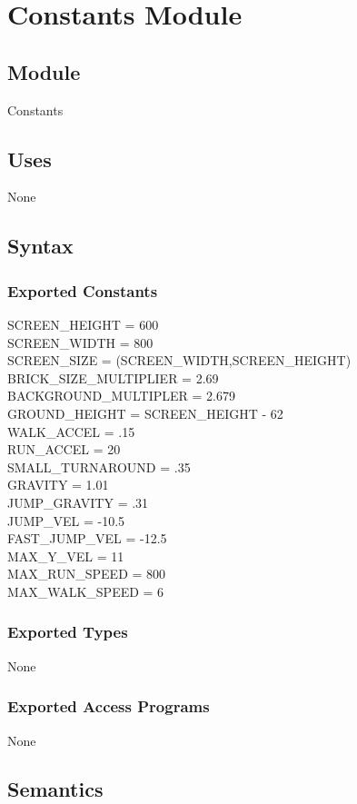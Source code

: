 \documentclass[12pt]{article}
\begin{document}
\newpage


\section* {Constants Module}
\subsection*{Module}
Constants
\subsection* {Uses}
None
\subsection* {Syntax}
\subsubsection* {Exported Constants}
SCREEN\_HEIGHT = 600\\
SCREEN\_WIDTH = 800\\
SCREEN\_SIZE = (SCREEN\_WIDTH,SCREEN\_HEIGHT)\\
BRICK\_SIZE\_MULTIPLIER = 2.69\\
BACKGROUND\_MULTIPLER = 2.679\\
GROUND\_HEIGHT = SCREEN\_HEIGHT - 62\\
WALK\_ACCEL = .15\\
RUN\_ACCEL = 20\\
SMALL\_TURNAROUND = .35\\
GRAVITY = 1.01\\
JUMP\_GRAVITY = .31\\
JUMP\_VEL = -10.5\\
FAST\_JUMP\_VEL = -12.5\\
MAX\_Y\_VEL = 11\\
MAX\_RUN\_SPEED = 800\\
MAX\_WALK\_SPEED = 6\\
\subsubsection* {Exported Types}
None
\subsubsection* {Exported Access Programs}
None
\subsection* {Semantics}
\end{document}
